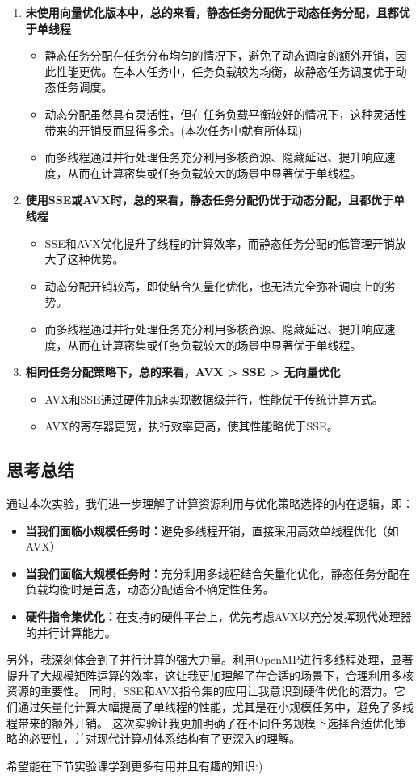 \documentclass{nku}
\begin{document}
\begin{enumerate}
    \item \textbf{未使用向量优化版本中，总的来看，静态任务分配优于动态任务分配，且都优于单线程}
    \begin{itemize}
        \item 静态任务分配在任务分布均匀的情况下，避免了动态调度的额外开销，因此性能更优。在本人任务中，任务负载较为均衡，故静态任务调度优于动态任务调度。
        \item 动态分配虽然具有灵活性，但在任务负载平衡较好的情况下，这种灵活性带来的开销反而显得多余。(本次任务中就有所体现)
        \item 而多线程通过并行处理任务充分利用多核资源、隐藏延迟、提升响应速度，从而在计算密集或任务负载较大的场景中显著优于单线程。
    \end{itemize}

    \item \textbf{使用SSE或AVX时，总的来看，静态任务分配仍优于动态分配，且都优于单线程}
    \begin{itemize}
        \item SSE和AVX优化提升了线程的计算效率，而静态任务分配的低管理开销放大了这种优势。
        \item 动态分配开销较高，即使结合矢量化优化，也无法完全弥补调度上的劣势。
        \item 而多线程通过并行处理任务充分利用多核资源、隐藏延迟、提升响应速度，从而在计算密集或任务负载较大的场景中显著优于单线程。
    \end{itemize}

    \item \textbf{相同任务分配策略下，总的来看，AVX > SSE > 无向量优化}
    \begin{itemize}
        \item AVX和SSE通过硬件加速实现数据级并行，性能优于传统计算方式。
        \item AVX的寄存器更宽，执行效率更高，使其性能略优于SSE。
    \end{itemize}
\end{enumerate}

\subsection{思考总结}
通过本次实验，我们进一步理解了计算资源利用与优化策略选择的内在逻辑，即：
\begin{itemize}
    \item \textbf{当我们面临小规模任务时：}避免多线程开销，直接采用高效单线程优化（如AVX）
    \item \textbf{当我们面临大规模任务时：}充分利用多线程结合矢量化优化，静态任务分配在负载均衡时是首选，动态分配适合不确定性任务。
    \item \textbf{硬件指令集优化：}在支持的硬件平台上，优先考虑AVX以充分发挥现代处理器的并行计算能力。
\end{itemize}

另外，我深刻体会到了并行计算的强大力量。利用OpenMP进行多线程处理，显著提升了大规模矩阵运算的效率，这让我更加理解了在合适的场景下，合理利用多核资源的重要性。
同时，SSE和AVX指令集的应用让我意识到硬件优化的潜力。它们通过矢量化计算大幅提高了单线程的性能，尤其是在小规模任务中，避免了多线程带来的额外开销。
这次实验让我更加明确了在不同任务规模下选择合适优化策略的必要性，并对现代计算机体系结构有了更深入的理解。

希望能在下节实验课学到更多有用并且有趣的知识:)
\end{document}
